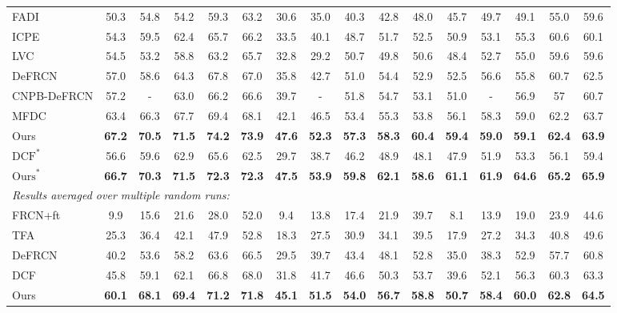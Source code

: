 \documentclass{article}
\begin{document}
\begin{table*}[!hbt]
\begin{adjustbox}{width=1\textwidth}
{\begin{tabular}{l|ccccc|ccccc|ccccc}
     FADI\cite{FADI} &50.3&54.8&54.2&59.3&63.2&30.6&35.0&40.3&42.8&48.0&45.7&49.7&49.1&55.0&59.6\\
     ICPE \cite{ICPE} & 54.3 & 59.5 &62.4 & 65.7 & 66.2 & 33.5 &40.1& 48.7 &51.7& 52.5 & 50.9 &53.1&55.3&60.6&60.1  \\
     LVC \cite{LVC} & 54.5 &53.2 & 58.8 & 63.2 & 65.7 &32.8& 29.2 &50.7& 49.8 & 50.6 &48.4&52.7&55.0&59.6&59.6  \\
    DeFRCN \cite{defrcn} &57.0 &58.6&64.3&67.8&67.0&35.8&42.7&51.0&54.4&52.9&52.5&56.6&55.8&60.7&62.5 \\
     CNPB-DeFRCN \cite{CNPB} & 57.2 &- & 63.0 & 66.2 & 66.6 &39.7& - &51.8& 54.7 & 53.1 &51.0&-&56.9&57&60.7  \\
     MFDC \cite{MFD} & 63.4 &66.3 & 67.7 & 69.4 & 68.1 &42.1& 46.5 &53.4& 55.3 & 53.8 &56.1&58.3&59.0&62.2&63.7  \\
    \rowcolor{Gray}
    Ours   &{\bf 67.2}&{\bf 70.5}&{\bf 71.5}&{\bf 74.2}&{\bf 73.9}&{\bf 47.6}&{\bf 52.3}&{\bf 57.3}&{\bf 58.3}&{\bf 60.4}&{\bf 59.4}&{\bf 59.0}&{\bf 59.1}&{\bf 62.4}&{\bf 63.9}\\
    \hline 
    $\text{DCF}^{*}$ \cite{dcf}   &56.6&59.6&62.9&65.6&62.5&29.7&38.7&46.2&48.9&48.1&47.9&51.9&53.3&56.1&59.4 \\
    \rowcolor{Gray}
    $\text{Ours}^{*}$   &{\bf 66.7}&{\bf 70.3}&{\bf 71.5}&{\bf 72.3}&{\bf 72.3}&{\bf 47.5}&{\bf 53.9}&{\bf 59.8}&{\bf 62.1}&{\bf 58.6}&{\bf 61.1}&{\bf 61.9}&{\bf 64.6}&{\bf 65.2}&{\bf 65.9}\\
    \midrule 
\multicolumn{16}{l}{\textit{Results averaged over multiple random runs:}}\\
    FRCN+ft \cite{metarcnn} & 9.9& 15.6  &21.6  &28.0  &52.0  &9.4& 13.8& 17.4&21.9& 39.7 &8.1&13.9&19.0&23.9&44.6\\
    TFA  \cite{tfa} & 25.3 & 36.4 & 42.1 & 47.9 & 52.8 & 18.3 & 27.5 & 30.9 & 34.1 & 39.5 & 17.9 & 27.2 & 34.3 & 40.8 & 49.6 \\
    DeFRCN \cite{defrcn}  &40.2 & 53.6 & 58.2 & 63.6 & 66.5 &29.5&39.7&43.4&48.1&52.8& 35.0 & 38.3 & 52.9 & 57.7 & 60.8 \\
    DCF  \cite{dcf} & 45.8&59.1&62.1&66.8&68.0&31.8&41.7&46.6&50.3&53.7&39.6&52.1&56.3&60.3&63.3\\
    \rowcolor{Gray}
    Ours   & {\bf 60.1}& {\bf 68.1} & {\bf 69.4} & {\bf 71.2} & {\bf 71.8} & {\bf 45.1} & {\bf 51.5} & {\bf 54.0} & {\bf 56.7} & {\bf 58.8} & {\bf 50.7} & {\bf 58.4} & {\bf 60.0} & {\bf 62.8} & {\bf 64.5} \\
    \bottomrule

  \end{tabular}
  }
\end{adjustbox}
\label{tab:PascalVOC1}
\end{table*}
\end{document}
